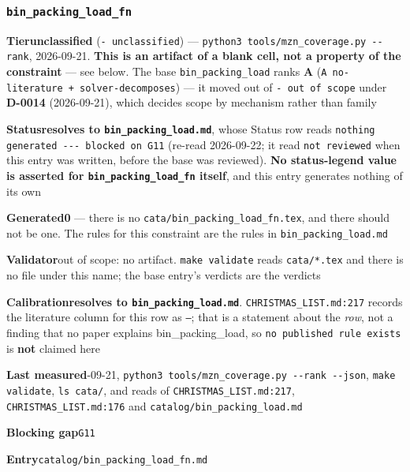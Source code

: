 \documentclass[10pt,a4paper]{article}
\newcommand{\entryfield}[2]{{\raggedright\textbf{#1}\quad #2\par}}
\begin{document}
\subsubsection*{\texttt{bin\_\allowbreak{}packing\_\allowbreak{}load\_\allowbreak{}fn}}
\label{entry:bin-packing-load-fn}
\entryfield{Tier}{\textbf{unclassified} (\texttt{- unclassified}) --- \texttt{python3 tools/\allowbreak{}mzn\_\allowbreak{}coverage.\allowbreak{}py -\allowbreak{}-\allowbreak{}rank}, 2026-09-21. \textbf{This is an artifact of a blank cell, not a property of the constraint} --- see below. The base \texttt{bin\_packing\_load} ranks \textbf{A} (\texttt{A no-\allowbreak{}literature + solver-\allowbreak{}decomposes}) --- it moved out of \texttt{- out of scope} under \textbf{D-0014} (2026-09-21), which decides scope by mechanism rather than family}
\entryfield{Status}{\textbf{resolves to \texttt{bin\_packing\_load.md}}, whose Status row reads \texttt{nothing generated -\allowbreak{}-\allowbreak{}-\allowbreak{} blocked on G11} (re-read 2026-09-22; it read \texttt{not reviewed} when this entry was written, before the base was reviewed). \textbf{No status-legend value is asserted for \texttt{bin\_packing\_load\_fn} itself}, and this entry generates nothing of its own}
\entryfield{Generated}{\textbf{0} --- there is no \texttt{cata/\allowbreak{}bin\_\allowbreak{}packing\_\allowbreak{}load\_\allowbreak{}fn.\allowbreak{}tex}, and there should not be one. The rules for this constraint are the rules in \texttt{bin\_packing\_load.md}}
\entryfield{Validator}{out of scope: no artifact. \texttt{make validate} reads \texttt{cata/*.tex} and there is no file under this name; the base entry's verdicts are the verdicts}
\entryfield{Calibration}{\textbf{resolves to \texttt{bin\_packing\_load.md}}. \texttt{CHRISTMAS\_LIST.md:217} records the literature column for this row as \texttt{---}; that is a statement about the \emph{row}, not a finding that no paper explains bin\_packing\_load, so \texttt{no published rule exists} is \textbf{not} claimed here}
\entryfield{Last measured}{2026-09-21, \texttt{python3 tools/\allowbreak{}mzn\_\allowbreak{}coverage.\allowbreak{}py -\allowbreak{}-\allowbreak{}rank -\allowbreak{}-\allowbreak{}json}, \texttt{make validate}, \texttt{ls cata/}, and reads of \texttt{CHRISTMAS\_LIST.md:217}, \texttt{CHRISTMAS\_LIST.md:176} and \texttt{catalog/\allowbreak{}bin\_\allowbreak{}packing\_\allowbreak{}load.\allowbreak{}md}}
\entryfield{Blocking gap}{\texttt{G11}}
\entryfield{Entry}{\texttt{catalog/bin\_packing\_load\_fn.md}}
\end{document}
